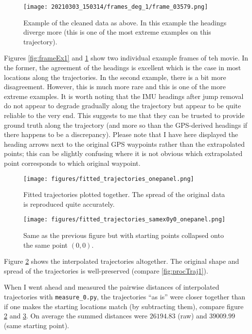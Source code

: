 \documentclass[a4]{article}
\begin{document}
\begin{figure}
  \texttt{[image: 20210303\_150314/frames\_deg\_1/frame\_03579.png]}
  \caption{\label{fig:frameEx2} Example of the cleaned data as
    above. In this example the headings diverge more (this is one of
    the most extreme examples on this trajectory).}
\end{figure}

Figures \ref{fig:frameEx1} and \ref{fig:frameEx2} show two individual
example frames of teh movie. In the former, the agreement of the headings is
excellent which is the case in most locations along the
trajectories. In the second example, there is a bit more
disagreement. However, this is much more rare and this is one of the
more extreme examples. It is worth noting that the IMU headings
after jump removal do not appear to degrade gradually along the
trajectory but appear to be quite reliable to the very end. This
suggests to me that they can be trusted to provide ground truth
along the trajectory (and more so than the GPS-derived headings
if there happens to be a discrepancy). Please note that I have here
displayed the heading arrows next to the original GPS waypoints
rather than the extrapolated points; this can be slightly confusing
where it is not obvious which extrapolated point corresponds to
which original waypoint.

\begin{figure}
  \texttt{[image: figures/fitted\_trajectories\_onepanel.png]}
  \caption{\label{fig:fittedTraj1} Fitted trajectories plotted
    together. The spread of the original data is reproduced quite
    accurately.
    }
\end{figure}

\begin{figure}
  \texttt{[image: figures/fitted\_trajectories\_samex0y0\_onepanel.png]}
  \caption{\label{fig:fittedTraj2} Same as the previous figure but with
    starting points collapsed onto the same point $(0,0)$.
    }
\end{figure}

Figure \ref{fig:fittedTraj1} shows the interpolated trajectories
altogether. The original shape and spread of the trajectories is
well-preserved (compare \ref{fig:procTraj1}).


When I went ahead and measured the pairwise distances of interpolated
trajectories with \verb+measure_0.py+, the trajectories ``as is'' were
closer together than if one makes the starting locations match (by
subtracting them), compare figure \ref{fig:fittedTraj1} and \ref{fig:fittedTraj2}. On average the summed distances were $26194.83$ (raw)
and $39009.99$ (same starting point).
\end{document}
